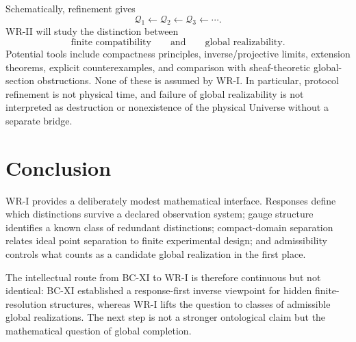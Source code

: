\documentclass[11pt]{article}
\begin{document}
Schematically, refinement gives
\[
\mathcal Q_1
\longleftarrow
\mathcal Q_2
\longleftarrow
\mathcal Q_3
\longleftarrow\cdots.
\]
WR-II will study the distinction between
\[
\text{finite compatibility}
\qquad\text{and}\qquad
\text{global realizability}.
\]
Potential tools include compactness principles, inverse/projective limits,
extension theorems, explicit counterexamples, and comparison with
sheaf-theoretic global-section obstructions. None of these is assumed by WR-I.
In particular, protocol refinement is not physical time, and failure of global
realizability is not interpreted as destruction or nonexistence of the physical
Universe without a separate bridge.

\section*{Conclusion}

WR-I provides a deliberately modest mathematical interface. Responses define
which distinctions survive a declared observation system; gauge structure
identifies a known class of redundant distinctions; compact-domain separation
relates ideal point separation to finite experimental design; and admissibility
controls what counts as a candidate global realization in the first place.

The intellectual route from BC-XI to WR-I is therefore continuous but not
identical: BC-XI established a response-first inverse viewpoint for hidden
finite-resolution structures, whereas WR-I lifts the question to classes of
admissible global realizations. The next step is not a stronger ontological
claim but the mathematical question of global completion.
\end{document}
